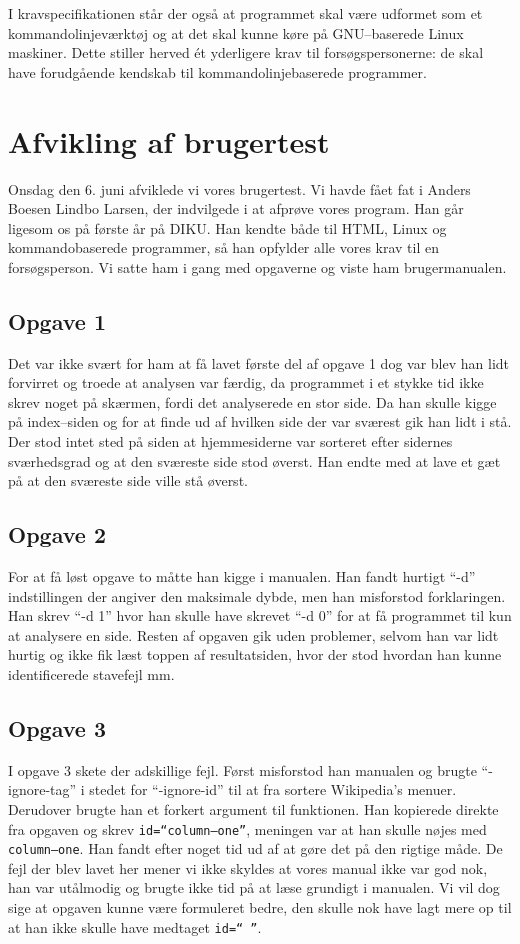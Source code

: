 \documentclass[a4paper,oneside,article]{memoir}
\begin{document}
I kravspecifikationen står der også at programmet skal være udformet
som et kommandolinjeværktøj og at det skal kunne køre på GNU--baserede
Linux maskiner. Dette stiller herved ét yderligere krav til
forsøgspersonerne: de skal have forudgående kendskab til
kommando\-linje\-baserede programmer.

\section{Afvikling af brugertest}
Onsdag den 6. juni afviklede vi vores brugertest. Vi havde fået fat i
Anders Boesen Lindbo Larsen, der indvilgede i at afprøve vores
program. Han går ligesom os på første år på DIKU. Han kendte både til
HTML, Linux og kommandobaserede programmer, så han opfylder alle vores
krav til en forsøgsperson. Vi satte ham i gang med opgaverne og viste
ham brugermanualen.

\subsection{Opgave 1}
Det var ikke svært for ham at få lavet første del af opgave 1 dog var
blev han lidt forvirret og troede at analysen var færdig, da
programmet i et stykke tid ikke skrev noget på skærmen, fordi det
analyserede en stor side. Da han skulle kigge på index--siden og for
at finde ud af hvilken side der var sværest gik han lidt i stå. Der
stod intet sted på siden at hjemmesiderne var sorteret efter sidernes
sværhedsgrad og at den sværeste side stod øverst. Han endte med at
lave et gæt på at den sværeste side ville stå øverst.

\subsection{Opgave 2}
For at få løst opgave to måtte han kigge i manualen. Han fandt hurtigt
``-d'' indstillingen der angiver den maksimale dybde, men han
misforstod forklaringen. Han skrev ``-d 1'' hvor han skulle have
skrevet ``-d 0'' for at få programmet til kun at analysere en side.
Resten af opgaven gik uden problemer, selvom han var lidt hurtig og
ikke fik læst toppen af resultatsiden, hvor der stod hvordan han kunne
identificerede stavefejl mm.

\subsection{Opgave 3}
I opgave 3 skete der adskillige fejl. Først misforstod han manualen og
brugte ``-ignore-tag'' i stedet for ``-ignore-id'' til at fra sortere
Wikipedia's menuer. Derudover brugte han et forkert argument til
funktionen. Han kopierede direkte fra opgaven og skrev
\texttt{id=``column--one''}, meningen var at han skulle nøjes med
\texttt{column--one}. Han fandt efter noget tid ud af at gøre det på
den rigtige måde. De fejl der blev lavet her mener vi ikke skyldes at
vores manual ikke var god nok, han var utålmodig og brugte ikke tid på
at læse grundigt i manualen. Vi vil dog sige at opgaven kunne være
formuleret bedre, den skulle nok have lagt mere op til at han ikke
skulle have medtaget \texttt{id=`` ''}.
\end{document}
